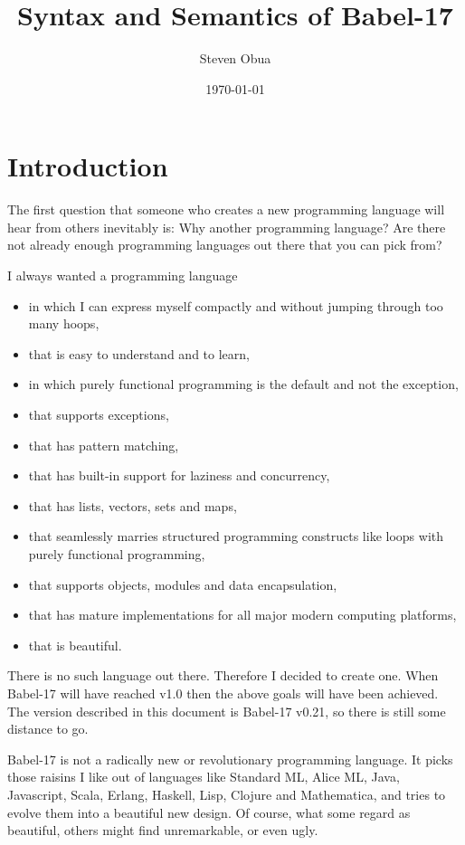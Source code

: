 \documentclass[11pt]{amsart}
\title{Syntax and Semantics of Babel-17}
\author{Steven Obua}
\date{\today}
\begin{document}


\maketitle

\tableofcontents


\section{Introduction}
The first question that someone who creates a new programming language will  hear from others inevitably is: Why another programming language? Are there not already enough programming languages out there that you can pick from?

I always wanted a programming language 
\begin{itemize}
\item in which I can express myself compactly and without jumping through too many hoops, 
\item that is easy to understand and to learn,
\item in which purely functional programming is the default and not the exception,
\item that supports exceptions,
\item that has pattern matching,
\item that has built-in support for laziness and concurrency,
\item that has lists, vectors, sets and maps,
\item that seamlessly marries structured programming constructs like loops with purely functional programming,
\item that supports objects, modules and data encapsulation,
\item that has mature implementations for all major modern computing platforms,
\item that is beautiful.
\end{itemize}
There is no such language out there. Therefore I decided to create one. When Babel-17 will have reached v1.0 then the above goals will have been achieved. The version described in this document is Babel-17 v0.21, so there is still some distance to go. 

Babel-17 is not a radically new or revolutionary programming language. It picks those raisins I like out of languages like Standard ML, Alice ML, Java, Javascript, Scala, Erlang, Haskell, Lisp, Clojure and Mathematica, and tries to evolve them into a beautiful new design. Of course, what some regard as beautiful, others might find unremarkable, or even ugly.
\end{document}
